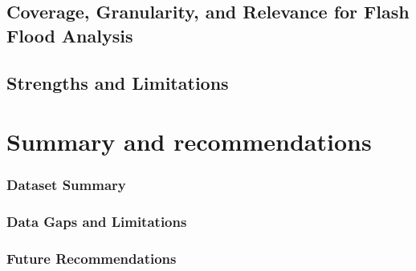 \subsection{Coverage, Granularity, and Relevance for Flash Flood Analysis}

\subsection{Strengths and Limitations}


































\section{Summary and recommendations}

\subsubsection{Dataset Summary}

\subsubsection{Data Gaps and Limitations}

\subsubsection{Future Recommendations}